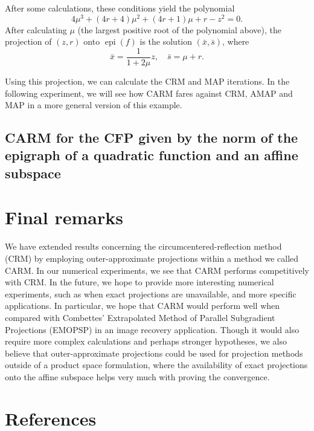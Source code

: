 \documentclass[smallextended,numbook,nospthms]{svjour3}
\theoremstyle{plain}
\theoremstyle{definition}
\DeclareMathOperator{\epi}{epi}
\begin{document}
After some calculations, these conditions yield the polynomial
\[
4 \mu^3 + (4r+4)\mu^2 + (4r+1)\mu + r-z^2=0.
\]
After calculating $\mu$ (the largest positive root of the polynomial above), the projection of $(z,r)$ onto $\epi(f)$ is the solution $(\bar{x},\bar{s})$, where
\[
\bar{x}=\frac{1}{1+2\mu}z, \quad \bar{s}=\mu + r.
\]

Using this projection, we can calculate the CRM and MAP iterations. In the following experiment, we will see how CARM fares against CRM, AMAP and MAP in a more general version of this example.

\subsection{CARM for the CFP given by the norm of the epigraph of a quadratic function and an affine subspace}

\newpage
\section{Final remarks}\label{sec:remarks}

We have extended results concerning the circumcentered-reflection method (CRM) by employing outer-approximate projections within a method we called CARM. In our numerical experiments, we see that CARM performs competitively with CRM. In the future, we hope to provide more interesting numerical experiments, such as when exact projections are unavailable, and more specific applications. In particular, we hope that CARM would perform well when compared with Combettes' Extrapolated Method of Parallel Subgradient Projections (EMOPSP) \cite{Combettes:1996} in an image recovery application. Though it would also require more complex calculations and perhaps stronger hypotheses, we also believe that outer-approximate projections could be used for projection methods outside of a product space formulation, where the availability of exact projections onto the affine subspace helps very much with proving the convergence.

\newpage
\section{References}




\newpage
\end{document}
